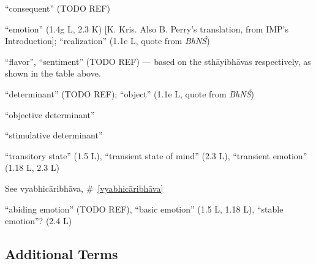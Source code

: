\documentclass[10pt]{article}
\begin{document}
\begin{multicols}{2}
\begin{enumerate}[
			leftmargin=0em,
			rightmargin=0em,
		]
		 ``consequent'' (TODO REF)

		 ``emotion'' (1.4g L, 2.3 K) [K. Kris. Also B. Perry's translation, from IMP's Introduction]; ``realization'' (1.1e L, quote from \textit{BhNŚ})

		 ``flavor'', ``sentiment'' (TODO REF) --- based on the sthāyibhāvas respectively, as shown in the table above.

		 ``determinant'' (TODO REF); ``object'' (1.1e L, quote from \textit{BhNŚ})
		\begin{enumerate}
			 ``objective determinant''

			 ``stimulative determinant''
		\end{enumerate}

		 ``transitory state'' (1.5 L), %
		``transient state of mind'' (2.3 L), %
		``transient emotion'' (1.18 L, 2.3 L)

		 See vyabhicāribhāva, \#~\ref{vyabhicāribhāva}

		 ``abiding emotion'' (TODO REF),
		``basic emotion'' (1.5 L, 1.18 L),
		``stable emotion''? (2.4 L)

	\end{enumerate}

	\subsection{Additional Terms}


\end{multicols}
\end{document}
